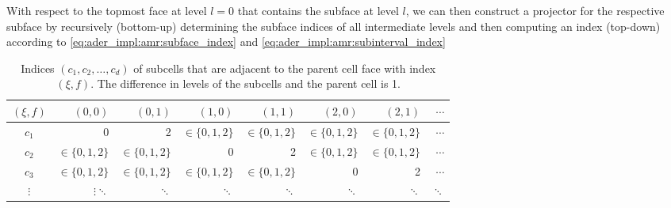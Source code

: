 \documentclass{scrreprt}
\theoremstyle{definition}
\theoremstyle{nonumberplain}
\begin{document}
With respect to the topmost face at level $l=0$
that contains the subface at level $l$, we
can then construct a projector for the respective subface
by recursively (bottom-up) determining the subface indices of all
intermediate levels and then computing an index (top-down) according to
\eqref{eq:ader_impl:amr:subface_index} and
\eqref{eq:ader_impl:amr:subinterval_index}
\begin{table}
\centering
\footnotesize
\renewcommand*{\arraystretch}{1.5}
\begin{tabular}{c|rrrrrrr}
$(\xi,f)$ & $(0,0)$ & $(0,1)$ & $(1,0)$ & $(1,1)$ & $(2,0)$ & $(2,1)$ & $\cdots$
\\
\hline
$c_{1}$ & 0 & 2 & $\in\{0,1,2\}$ & $\in\{0,1,2\}$ & $\in\{0,1,2\}$ &
$\in\{0,1,2\}$ & $\cdots$
\\
$c_{2}$ & $\in\{0,1,2\}$ & $\in\{0,1,2\}$ & 0 & 2 & $\in\{0,1,2\}$ & $\in\{0,1,2\}$
& $\cdots$
\\
$c_{3}$ & $\in\{0,1,2\}$ & $\in\{0,1,2\}$ & $\in\{0,1,2\}$ & $\in\{0,1,2\}$ & 0 & 2
& $\cdots$
\\
$\vdots$ & $\vdots\ddots$ & $\ddots$ & $\ddots$ & $\ddots$ & $\ddots$ & $\ddots$
& $\ddots$
\end{tabular}
\caption{Indices $(c_1,c_2,\ldots,c_d)$ of subcells that are adjacent
to the parent cell face with index $(\xi,f)$. The difference
in levels of the subcells and the parent cell is 1.}
\label{tab:ader_impl:amr:map_face_index_to_subcell_indices}
\end{table}
\end{document}
